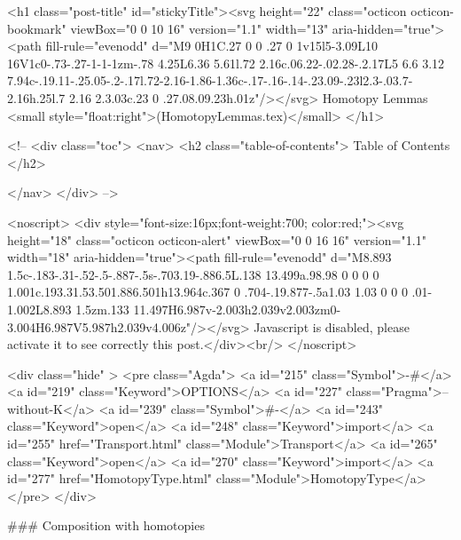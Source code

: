   <h1 class="post-title" id="stickyTitle"><svg height="22" class="octicon octicon-bookmark" viewBox="0 0 10 16" version="1.1" width="13" aria-hidden="true"><path fill-rule="evenodd" d="M9 0H1C.27 0 0 .27 0 1v15l5-3.09L10 16V1c0-.73-.27-1-1-1zm-.78 4.25L6.36 5.61l.72 2.16c.06.22-.02.28-.2.17L5 6.6 3.12 7.94c-.19.11-.25.05-.2-.17l.72-2.16-1.86-1.36c-.17-.16-.14-.23.09-.23l2.3-.03.7-2.16h.25l.7 2.16 2.3.03c.23 0 .27.08.09.23h.01z"/></svg> Homotopy Lemmas <small style="float:right">(HomotopyLemmas.tex)</small>
  </h1>

  <!-- 
  <div class="toc">
    <nav>
    <h2 class="table-of-contents"> Table of Contents </h2>
      

    </nav>
  </div>
   -->

  <noscript>
  <div style="font-size:16px;font-weight:700; color:red;"><svg height="18" class="octicon octicon-alert" viewBox="0 0 16 16" version="1.1" width="18" aria-hidden="true"><path fill-rule="evenodd" d="M8.893 1.5c-.183-.31-.52-.5-.887-.5s-.703.19-.886.5L.138 13.499a.98.98 0 0 0 0 1.001c.193.31.53.501.886.501h13.964c.367 0 .704-.19.877-.5a1.03 1.03 0 0 0 .01-1.002L8.893 1.5zm.133 11.497H6.987v-2.003h2.039v2.003zm0-3.004H6.987V5.987h2.039v4.006z"/></svg> Javascript is disabled, please activate it to see correctly this post.</div><br/>
  </noscript>

  <div class="hide" >
<pre class="Agda">
<a id="215" class="Symbol">{-#</a> <a id="219" class="Keyword">OPTIONS</a> <a id="227" class="Pragma">--without-K</a> <a id="239" class="Symbol">#-}</a>
<a id="243" class="Keyword">open</a> <a id="248" class="Keyword">import</a> <a id="255" href="Transport.html" class="Module">Transport</a>
<a id="265" class="Keyword">open</a> <a id="270" class="Keyword">import</a> <a id="277" href="HomotopyType.html" class="Module">HomotopyType</a>
</pre>
</div>


### Composition with homotopies

